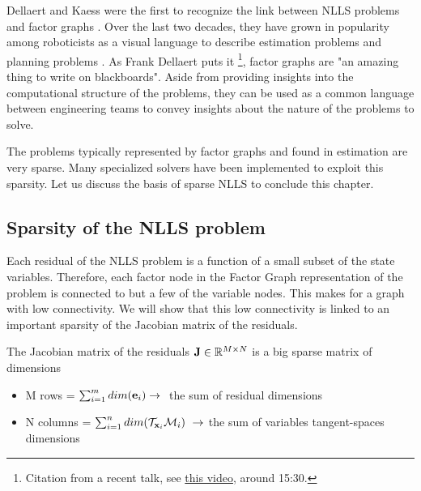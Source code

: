Dellaert and Kaess \cite{dellaert2006square} were the first to
recognize the link between NLLS problems and factor graphs \cite{dong2019minisam}. Over the last two decades, they have grown in popularity among roboticists as a visual language to describe 
estimation problems \cite{dellaert2017factor} and planning problems \cite{dong2016motion}. As Frank Dellaert puts it \footnote{Citation from a recent talk,
see \href{https://www.youtube.com/watch?v=-yCC7mpgL4w}{this video}, around 15:30.}, factor graphs are "an amazing thing to write on blackboards".   
Aside from providing insights into the computational structure of the problems, they can be used as a common language between engineering teams
to convey insights about the nature of the problems to solve.


The problems typically represented by factor graphs and found in estimation are very sparse.
Many specialized solvers \cite{grisetti2011g2o, kaess2012isam2, ila2017slam++} have been implemented to exploit this sparsity. 
Let us discuss the basis of sparse NLLS to conclude this chapter.




\subsection{Sparsity of the NLLS problem}

Each residual of the NLLS problem is a function of a small subset of the state variables. Therefore, each factor node in the Factor Graph representation of the problem is connected to but a few of the variable nodes. This makes for a graph with low connectivity. We will show that this low connectivity is linked to an important sparsity of the Jacobian matrix of the residuals.

The Jacobian matrix of the residuals ${\bf J} \in \mathbb{R}^{M \times N}$ is a big sparse matrix of dimensions 
\begin{itemize}
    \item M rows = $\sum_{i=1}^{m}dim({\bf e}_i) \rightarrow~$ the sum of residual dimensions
    \item N columns = $\sum_{i=1}^{n}dim(\mathcal{T}_{{\bf x}_i}\mathcal{M}_i)~\rightarrow$ the sum of variables tangent-spaces dimensions 
\end{itemize}   

